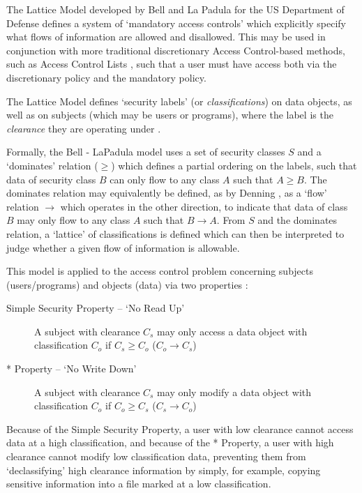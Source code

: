 The Lattice Model developed by Bell and La Padula for the US Department of Defense \cite{bell1976lattice} defines a system of `mandatory access controls' which explicitly specify what flows of information are allowed and disallowed. This may be used in conjunction with more traditional discretionary Access Control-based methods, such as Access Control Lists \cite{sandhu1993lattice}, such that a user must have access both via the discretionary policy and the mandatory policy.

The Lattice Model defines `security labels' (or \textit{classifications}) on data objects, as well as on subjects (which may be users or programs), where the label is the \textit{clearance} they are operating under \cite{denning1976lattice}.

Formally, the Bell - LaPadula model uses a set of security classes $ S $ and a `dominates' relation ($ \ge $) \cite{sandhu1993lattice} which defines a partial ordering on the labels, such that data of security class $ B $ can only flow to any class $ A $ such that $ A \ge B $. The dominates relation may equivalently be defined, as by Denning \cite{denning1976lattice}, as a `flow' relation $ \rightarrow $ which operates in the other direction, to indicate that data of class $ B $ may only flow to any class $ A $ such that $ B \rightarrow A $. From $ S $ and the dominates relation, a `lattice' of classifications is defined which can then be interpreted to judge whether a given flow of information is allowable.

This model is applied to the access control problem concerning subjects (users/programs) and objects (data) via two properties \cite{bell1973lattice}:

\begin{description}
	\item[Simple Security Property -- `No Read Up'] A subject with clearance $ C_s $ may only access a data object with classification $ C_o $ if $ C_s \ge C_o $ ($ C_o \rightarrow C_s $)
	\item[* Property -- `No Write Down'] A subject with clearance $ C_s $ may only modify a data object with classification $ C_o $ if $ C_o \ge C_s $ ($ C_s \rightarrow C_o $)
\end{description}

Because of the Simple Security Property, a user with low clearance cannot access data at a high classification, and because of the * Property, a user with high clearance cannot modify low classification data, preventing them from `declassifying' high clearance information by simply, for example, copying sensitive information into a file marked at a low classification.

